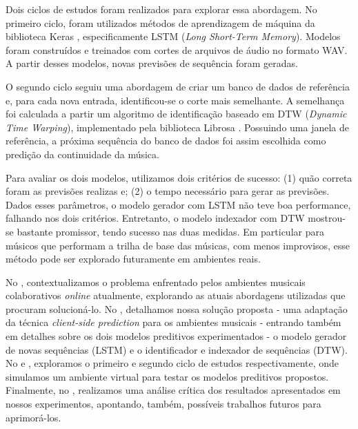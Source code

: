 Dois ciclos de estudos foram realizados para explorar essa abordagem. No primeiro ciclo, foram utilizados métodos de aprendizagem de máquina da biblioteca Keras \cite{keras}, especificamente LSTM (\textit{Long Short-Term Memory})\cite{lstm}. Modelos foram construídos e treinados com cortes de arquivos de áudio no formato WAV. A partir desses modelos, novas previsões de sequência foram geradas.

O segundo ciclo seguiu uma abordagem de criar um banco de dados de referência e, para cada nova entrada, identificou-se o corte mais semelhante. A semelhança foi calculada a partir um algoritmo de identificação baseado em DTW (\textit{Dynamic Time Warping})\cite{dtw}, implementado pela biblioteca Librosa \cite{librosa}. Possuindo uma janela de referência, a próxima sequência do banco de dados foi assim escolhida como predição da continuidade da música.

Para avaliar os dois modelos, utilizamos dois critérios de sucesso: (1) quão correta foram as previsões realizas e; (2) o tempo necessário para gerar as previsões. Dados esses parâmetros, o modelo gerador com LSTM não teve boa performance, falhando nos dois critérios. Entretanto, o modelo indexador com DTW mostrou-se bastante promissor, tendo sucesso nas duas medidas. Em particular para músicos que performam a trilha de base das músicas, com menos improvisos, esse método pode ser explorado futuramente em ambientes reais.

No , contextualizamos o problema enfrentado pelos ambientes musicais colaborativos \textit{online} atualmente, explorando as atuais abordagens utilizadas que procuram solucioná-lo. No , detalhamos nossa solução proposta - uma adaptação da técnica \textit{client-side prediction} para os ambientes musicais - entrando também em detalhes sobre os dois modelos preditivos experimentados - o modelo gerador de novas sequências (LSTM) e o identificador e indexador de sequências (DTW). No  e , exploramos o primeiro e segundo ciclo de estudos respectivamente, onde simulamos um ambiente virtual para testar os modelos preditivos propostos. Finalmente, no , realizamos uma análise crítica dos resultados apresentados em nossos experimentos, apontando, também, possíveis trabalhos futuros para aprimorá-los.